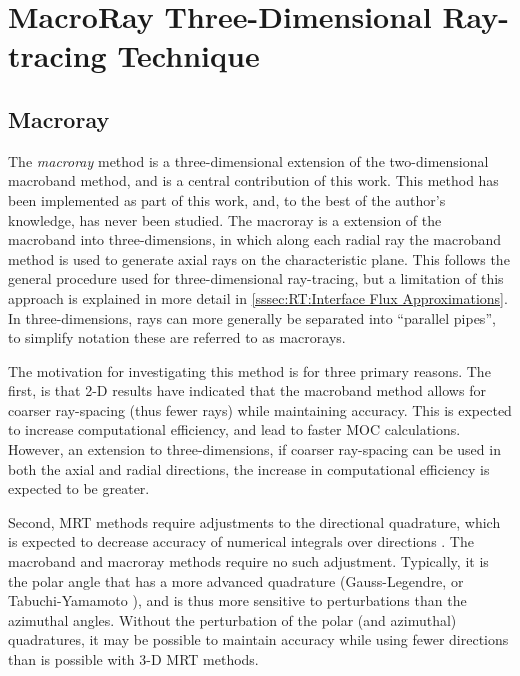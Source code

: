 \chapter{MacroRay Three-Dimensional Ray-tracing Technique}{\label{ch:MacroRay Three-Dimensional Ray-tracing Technique}
  
  
  
  \def\figpath{chapters/MacroRay/figures/}
  \graphicspath{ {\figpath} }

  \section{Macroray}{\label{sec:RT:Macroray}
    The \emph{macroray} method is a three-dimensional extension of the two-dimensional macroband method, and is a central contribution of this work.
    This method has been implemented as part of this work, and, to the best of the author's knowledge, has never been studied.
    The macroray is a extension of the macroband into three-dimensions, in which along each radial ray the macroband method is used to generate axial rays on the characteristic plane.
    This follows the general procedure used for three-dimensional ray-tracing, but a limitation of this approach is explained in more detail in \cref{sssec:RT:Interface Flux Approximations}.
    In three-dimensions, rays can more generally be separated into ``parallel pipes'', to simplify notation these are referred to as macrorays.

    The motivation for investigating this method is for three primary reasons.
    The first, is that 2-D results \cite{Yamamoto2005,Fevotte2007,Yamamoto2008} have indicated that the macroband method allows for coarser ray-spacing (thus fewer rays) while maintaining accuracy.
    This is expected to increase computational efficiency, and lead to faster \ac{MOC} calculations.
    However, an extension to three-dimensions, if coarser ray-spacing can be used in both the axial and radial directions, the increase in computational efficiency is expected to be greater.

    Second, \ac{MRT} methods require adjustments to the directional quadrature, which is expected to decrease accuracy of numerical integrals over directions \cite{Kochunas2013}.
    The macroband and macroray methods require no such adjustment.
    Typically, it is the polar angle that has a more advanced quadrature (Gauss-Legendre, or Tabuchi-Yamamoto \cite{TabuchiYamamotoQuad}), and is thus more sensitive to perturbations than the azimuthal angles.
    Without the perturbation of the polar (and azimuthal) quadratures, it may be possible to maintain accuracy while using fewer directions than is possible with 3-D \ac{MRT} methods.

}}
